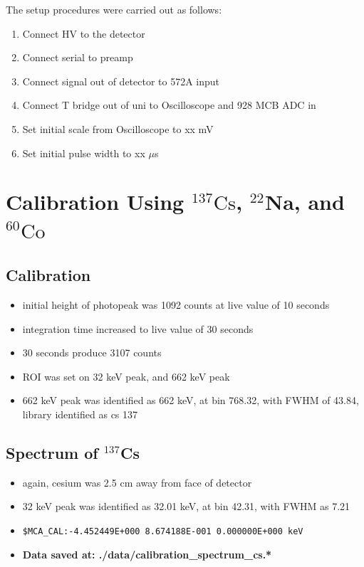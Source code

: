 \documentclass[a4paper]{article}
\begin{document}
The setup procedures were carried out as follows:
\begin{enumerate}
\item Connect HV to the detector
\item Connect serial to preamp
\item Connect signal out of detector to 572A input
\item Connect T bridge out of uni to Oscilloscope and 928 MCB ADC in
\item Set initial scale from Oscilloscope to xx mV
\item Set initial pulse width to xx $\mu$s
\end{enumerate}
\section{Calibration Using $^{137}\mathrm{Cs}$, $^{22}\mathbf{Na}$, and $^{60}\mathrm{Co}$}
\subsection{Calibration}
\begin{itemize}
    \item initial height of photopeak was 1092 counts at live value of 10 seconds
    \item integration time increased to live value of 30 seconds
    \item 30 seconds produce 3107 counts
    \item ROI was set on 32 keV peak, and 662 keV peak
    \item 662 keV peak was identified as 662 keV, at bin 768.32, with FWHM of 43.84, library identified as cs 137
\end{itemize}

\subsection{Spectrum of $^{137}$Cs}
\begin{itemize}
    \item again, cesium was 2.5 cm away from face of detector
    \item 32 keV peak was identified as 32.01 keV, at bin 42.31, with FWHM as 7.21
    \item \verb|$MCA_CAL:-4.452449E+000 8.674188E-001 0.000000E+000 keV|
    \item \textbf{Data saved at: ./data/calibration\_spectrum\_cs.*}
\end{itemize}
\end{document}
